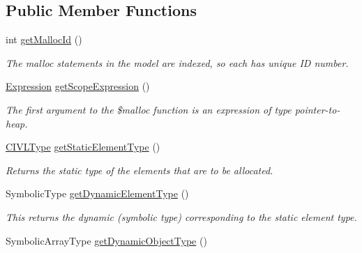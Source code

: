 \subsection*{Public Member Functions}
\begin{DoxyCompactItemize}
\item 
int \hyperlink{interfaceedu_1_1udel_1_1cis_1_1vsl_1_1civl_1_1model_1_1IF_1_1statement_1_1MallocStatement_a9570887f917256ada3fb6d5222e981e6}{get\+Malloc\+Id} ()
\begin{DoxyCompactList}\small\item\em The malloc statements in the model are indexed, so each has unique I\+D number. \end{DoxyCompactList}\item 
\hyperlink{interfaceedu_1_1udel_1_1cis_1_1vsl_1_1civl_1_1model_1_1IF_1_1expression_1_1Expression}{Expression} \hyperlink{interfaceedu_1_1udel_1_1cis_1_1vsl_1_1civl_1_1model_1_1IF_1_1statement_1_1MallocStatement_ad7e57b22866ac6462dd24449c1c32f53}{get\+Scope\+Expression} ()
\begin{DoxyCompactList}\small\item\em The first argument to the \$malloc function is an expression of type pointer-\/to-\/heap. \end{DoxyCompactList}\item 
\hyperlink{interfaceedu_1_1udel_1_1cis_1_1vsl_1_1civl_1_1model_1_1IF_1_1type_1_1CIVLType}{C\+I\+V\+L\+Type} \hyperlink{interfaceedu_1_1udel_1_1cis_1_1vsl_1_1civl_1_1model_1_1IF_1_1statement_1_1MallocStatement_aa182f4839b69a8d99cdebba5734bc63f}{get\+Static\+Element\+Type} ()
\begin{DoxyCompactList}\small\item\em Returns the static type of the elements that are to be allocated. \end{DoxyCompactList}\item 
Symbolic\+Type \hyperlink{interfaceedu_1_1udel_1_1cis_1_1vsl_1_1civl_1_1model_1_1IF_1_1statement_1_1MallocStatement_a2a05ca6af44d9b07e71acbd672c92ce0}{get\+Dynamic\+Element\+Type} ()
\begin{DoxyCompactList}\small\item\em This returns the dynamic (symbolic type) corresponding to the static element type. \end{DoxyCompactList}\item 
Symbolic\+Array\+Type \hyperlink{interfaceedu_1_1udel_1_1cis_1_1vsl_1_1civl_1_1model_1_1IF_1_1statement_1_1MallocStatement_aab8cf4e1964f1c4a884ddc86e4e9c13c}{get\+Dynamic\+Object\+Type} ()

\end{DoxyCompactItemize}
